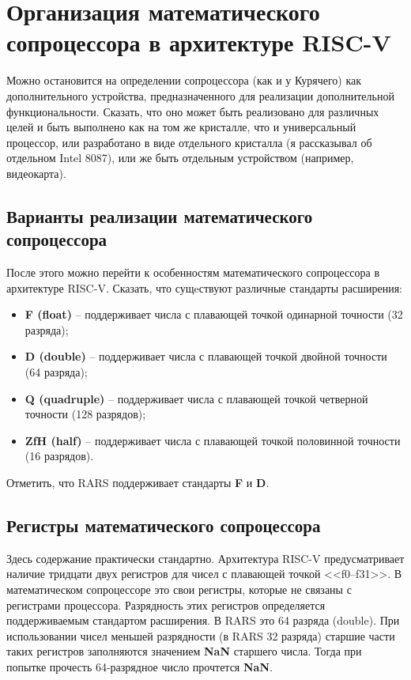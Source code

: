 \section{Организация математического сопроцессора в архитектуре RISC-V}

Можно остановится на определении сопроцессора (как и у Курячего) как дополнительного устройства, предназначенного для реализации дополнительной функциональности. Сказать, что оно может быть реализовано для различных целей и быть выполнено как на том же кристалле, что и универсальный процессор, или разработано в виде отдельного кристалла (я рассказывал об отдельном Intel 8087), или же быть отдельным устройством (например, видеокарта).


\subsection{Варианты реализации математического сопроцессора}

После этого можно перейти к особенностям математического сопроцессора в архитектуре RISC-V. Сказать, что сущeствуют различные стандарты расширения:
\begin{itemize}
    \item \textbf{F (float)} --  поддерживает числа с плавающей точкой одинарной точности (32 разряда);
    \item \textbf{D (double)} -- поддерживает числа с плавающей точкой двойной точности (64 разряда);
    \item \textbf{Q (quadruple)} -- поддерживает числа с плавающей точкой четверной точности (128 разрядов);
    \item \textbf{ZfH (half)} -- поддерживает числа с плавающей точкой половинной точности (16 разрядов).
\end{itemize}
Отметить, что RARS поддерживает стандарты \textbf{F} и \textbf{D}.

\subsection{Регистры математического сопроцессора}

Здесь содержание практически стандартно. Архитектура RISC-V предусматривает наличие тридцати двух регистров для чисел с плавающей точкой <<f0–f31>>. В математическом сопроцессоре это свои регистры, которые не связаны с регистрами процессора. Разрядность этих регистров определяется поддерживаемым стандартом расширения. В RARS это 64 разряда (double). При использовании чисел меньшей разрядности (в RARS 32 разряда) старшие части таких регистров заполняются значением \textbf{NaN} старшего числа. Тогда при попытке прочесть 64-разрядное число прочтется \textbf{NaN}.

